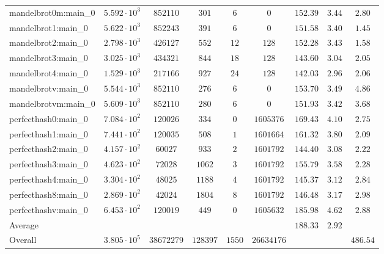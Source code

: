 \begin{tabular}{|l|c|c|c|c|c|c|c|c|}
mandelbrot0m:main\_0           & $ 5.592 \cdot 10^{3} $ & $ 852110   $ & $ 301    $ & $ 6    $ & $ 0        $ & $ 152.39      $ & $ 3.44    $ & $ 2.80    $ \\
mandelbrot1:main\_0            & $ 5.622 \cdot 10^{3} $ & $ 852243   $ & $ 391    $ & $ 6    $ & $ 0        $ & $ 151.58      $ & $ 3.40    $ & $ 1.45    $ \\
mandelbrot2:main\_0            & $ 2.798 \cdot 10^{3} $ & $ 426127   $ & $ 552    $ & $ 12   $ & $ 128      $ & $ 152.28      $ & $ 3.43    $ & $ 1.58    $ \\
mandelbrot3:main\_0            & $ 3.025 \cdot 10^{3} $ & $ 434321   $ & $ 844    $ & $ 18   $ & $ 128      $ & $ 143.60      $ & $ 3.04    $ & $ 2.05    $ \\
mandelbrot4:main\_0            & $ 1.529 \cdot 10^{3} $ & $ 217166   $ & $ 927    $ & $ 24   $ & $ 128      $ & $ 142.03      $ & $ 2.96    $ & $ 2.06    $ \\
mandelbrotv:main\_0            & $ 5.544 \cdot 10^{3} $ & $ 852110   $ & $ 276    $ & $ 6    $ & $ 0        $ & $ 153.70      $ & $ 3.49    $ & $ 4.86    $ \\
mandelbrotvm:main\_0           & $ 5.609 \cdot 10^{3} $ & $ 852110   $ & $ 280    $ & $ 6    $ & $ 0        $ & $ 151.93      $ & $ 3.42    $ & $ 3.68    $ \\
perfecthash0:main\_0           & $ 7.084 \cdot 10^{2} $ & $ 120026   $ & $ 334    $ & $ 0    $ & $ 1605376  $ & $ 169.43      $ & $ 4.10    $ & $ 2.75    $ \\
perfecthash1:main\_0           & $ 7.441 \cdot 10^{2} $ & $ 120035   $ & $ 508    $ & $ 1    $ & $ 1601664  $ & $ 161.32      $ & $ 3.80    $ & $ 2.09    $ \\
perfecthash2:main\_0           & $ 4.157 \cdot 10^{2} $ & $ 60027    $ & $ 933    $ & $ 2    $ & $ 1601792  $ & $ 144.40      $ & $ 3.08    $ & $ 2.22    $ \\
perfecthash3:main\_0           & $ 4.623 \cdot 10^{2} $ & $ 72028    $ & $ 1062   $ & $ 3    $ & $ 1601792  $ & $ 155.79      $ & $ 3.58    $ & $ 2.28    $ \\
perfecthash4:main\_0           & $ 3.304 \cdot 10^{2} $ & $ 48025    $ & $ 1188   $ & $ 4    $ & $ 1601792  $ & $ 145.37      $ & $ 3.12    $ & $ 2.84    $ \\
perfecthash8:main\_0           & $ 2.869 \cdot 10^{2} $ & $ 42024    $ & $ 1804   $ & $ 8    $ & $ 1601792  $ & $ 146.48      $ & $ 3.17    $ & $ 2.98    $ \\
perfecthashv:main\_0           & $ 6.453 \cdot 10^{2} $ & $ 120019   $ & $ 449    $ & $ 0    $ & $ 1605632  $ & $ 185.98      $ & $ 4.62    $ & $ 2.88    $ \\
\hline
Average                        & $                    $ & $          $ & $        $ & $      $ & $          $ & $ 188.33      $ & $ 2.92    $ & $         $ \\
\hline
Overall                        & $ 3.805 \cdot 10^{5} $ & $ 38672279 $ & $ 128397 $ & $ 1550 $ & $ 26634176 $ & $             $ & $         $ & $ 486.54  $ \\
\hline
\end{tabular}
